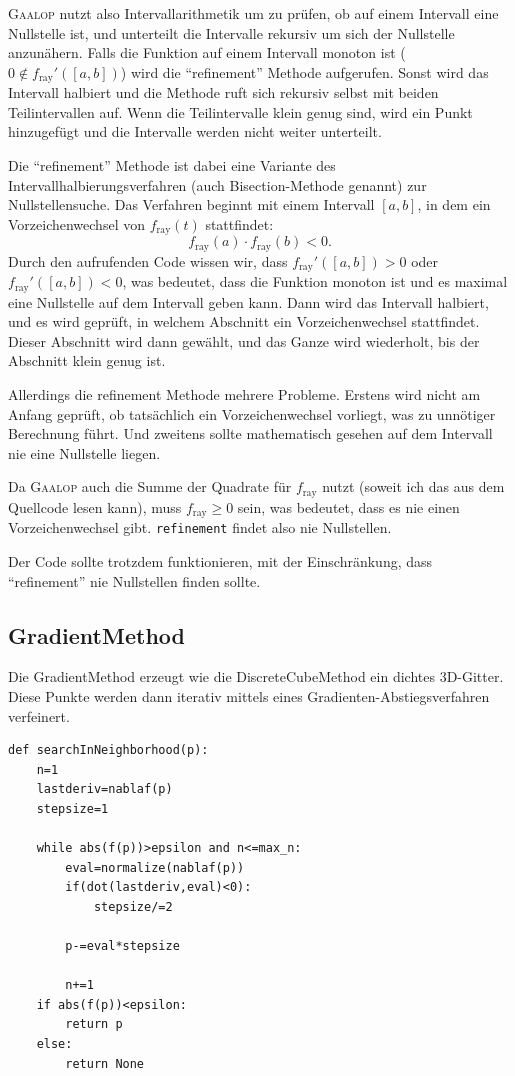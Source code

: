 \documentclass[
	ngerman,%
	accentcolor=9c,%
	ruledheaders=section,%
	class=report,%
	thesis={type=bachelor},%
	fontsize=11pt,%
	parskip=half-,%
	custommargins=true,%
	marginpar=false,%
]{tudapub}
\begin{document}
\textsc{Gaalop} nutzt also Intervallarithmetik um zu prüfen, ob auf einem Intervall eine Nullstelle ist, und unterteilt die Intervalle rekursiv um sich der Nullstelle anzunähern. Falls die Funktion auf einem Intervall monoton ist (\(0 \notin f_{\text{ray}}'([a,b]) \)) wird die \enquote{refinement} Methode aufgerufen. Sonst wird das Intervall halbiert und die Methode ruft sich rekursiv selbst mit beiden Teilintervallen auf. Wenn die Teilintervalle klein genug sind, wird ein Punkt hinzugefügt und die Intervalle werden nicht weiter unterteilt. 

Die \enquote{refinement} Methode ist dabei eine Variante des Intervallhalbierungsverfahren  (auch Bisection-Methode genannt) zur Nullstellensuche.
Das Verfahren beginnt mit einem Intervall \([a,b]\), in dem ein Vorzeichenwechsel von \( f_{\text{ray}}(t) \) stattfindet:
\[
f_{\text{ray}}(a) \cdot f_{\text{ray}}(b) < 0.
\]
Durch den aufrufenden Code wissen wir, dass \( f_{\text{ray}}'([a,b]) > 0 \) oder \( f_{\text{ray}}'([a,b]) < 0 \), was bedeutet, dass die Funktion monoton ist und es maximal eine Nullstelle auf dem Intervall geben kann. Dann wird das Intervall halbiert, und es wird geprüft, in welchem Abschnitt ein Vorzeichenwechsel stattfindet. Dieser Abschnitt wird dann gewählt, und das Ganze wird wiederholt, bis der Abschnitt klein genug ist.

Allerdings die refinement Methode mehrere Probleme. Erstens wird nicht am Anfang geprüft, ob tatsächlich ein Vorzeichenwechsel vorliegt, was zu unnötiger Berechnung führt. Und zweitens sollte mathematisch gesehen auf dem Intervall nie eine Nullstelle liegen.

Da \textsc{Gaalop} auch die Summe der Quadrate für \( f_{\text{ray}} \) nutzt (soweit ich das aus dem Quellcode lesen kann), muss \( f_{\text{ray}} \geq 0 \) sein, was bedeutet, dass es nie einen Vorzeichenwechsel gibt. 
\texttt{refinement} findet also nie Nullstellen. 

Der Code sollte trotzdem funktionieren, mit der Einschränkung, dass \enquote{refinement} nie Nullstellen finden sollte.

\subsection{GradientMethod}
Die GradientMethod erzeugt wie die DiscreteCubeMethod ein dichtes 3D-Gitter. Diese Punkte werden dann iterativ mittels eines Gradienten-Abstiegsverfahren verfeinert.

\begin{verbatim}
def searchInNeighborhood(p):
    n=1
    lastderiv=nablaf(p)
    stepsize=1
    
    while abs(f(p))>epsilon and n<=max_n:
        eval=normalize(nablaf(p))
        if(dot(lastderiv,eval)<0):
            stepsize/=2

        p-=eval*stepsize

        n+=1
    if abs(f(p))<epsilon:
        return p
    else:
        return None
        
\end{verbatim}
\end{document}
